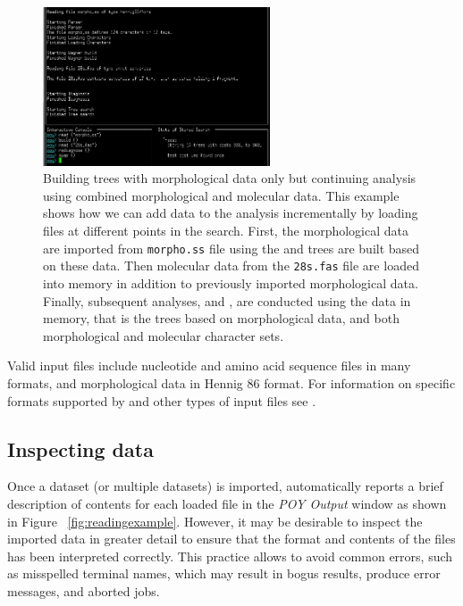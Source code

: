 \begin{figure}[]
    \begin{center}
        \includegraphics[width=0.6\textwidth]{figures/reading_example2.jpg}
    \end{center}
    \caption{Building trees with morphological data only but continuing analysis using combined morphological and molecular data. This example shows how we can add data to the analysis incrementally by loading files at different points in the search. First, the morphological data are imported from \texttt{morpho.ss} file using  the and trees are built based on these data. Then molecular data from the \texttt{28s.fas} file are loaded into memory in addition to previously imported morphological data. Finally, subsequent analyses,  and , are conducted using the data in memory, that is the trees based on morphological data, and both morphological and molecular character sets.}
    \label{fig:reading_example2}
\end{figure}

Valid input files include nucleotide and amino acid sequence files in many formats,
and morphological data in Hennig 86 format. For information on specific formats supported by \poy and other types of input files see .

\subsection{Inspecting data}

Once a dataset (or multiple datasets) is imported, \poy automatically reports a brief description of contents for each loaded file in the \emph{POY Output} window as shown in Figure ~\ref{fig:readingexample}. However, it may be desirable to inspect the imported data in greater detail to ensure that the format and contents of the files has been interpreted correctly. This practice allows to avoid common errors, such as misspelled terminal names, which may result in bogus results, produce error messages, and aborted jobs.

